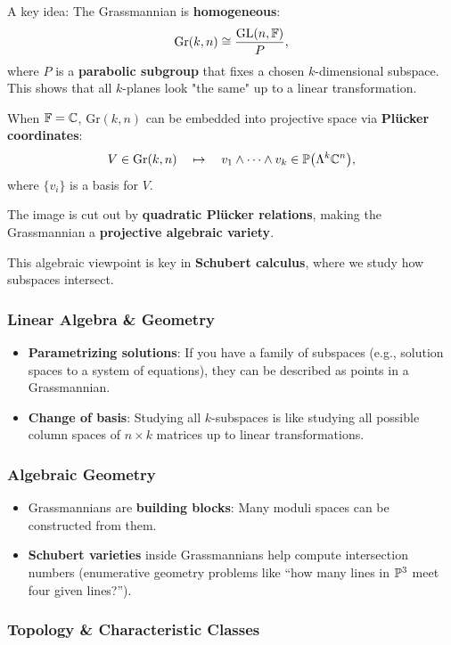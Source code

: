 \documentclass{amsart}
\let\originalmathbb\mathbb
\renewcommand{\mathbb}[1]{%
    \ifstrequal{#1}{1}{\mathbbm{#1}}{\originalmathbb{#1}}%
}
\theoremstyle{plain}
\theoremstyle{definition}
\theoremstyle{remark}
\begin{document}
A key idea:
The Grassmannian is \textbf{homogeneous}:
\[
\mathrm{Gr}(k, n) \cong \frac{\mathrm{GL}(n, \mathbb{F})}{P},
\]
where $P$ is a \textbf{parabolic subgroup} that fixes a chosen $k$-dimensional subspace. This shows that all $k$-planes look "the same" up to a linear transformation.

When $\mathbb{F} = \mathbb{C}$, $\mathrm{Gr}(k, n)$ can be embedded into projective space via \textbf{Plücker coordinates}:
\[
V \in \mathrm{Gr}(k, n) \quad \mapsto \quad v_1 \wedge \cdots \wedge v_k \in \mathbb{P}\big(\Lambda^k \mathbb{C}^n\big),
\]
where $\{v_i\}$ is a basis for $V$.

The image is cut out by \textbf{quadratic Plücker relations}, making the Grassmannian a \textbf{projective algebraic variety}.

This algebraic viewpoint is key in \textbf{Schubert calculus}, where we study how subspaces intersect.

\subsubsection{\textbf{Linear Algebra \& Geometry}}

\begin{itemize}
	\item \textbf{Parametrizing solutions}: If you have a family of subspaces (e.g., solution spaces to a system of equations), they can be described as points in a Grassmannian.
	\item \textbf{Change of basis}: Studying all $k$-subspaces is like studying all possible column spaces of $n \times k$ matrices up to linear transformations.
\end{itemize}

\subsubsection{\textbf{Algebraic Geometry}}

\begin{itemize}
	\item Grassmannians are \textbf{building blocks}: Many moduli spaces can be constructed from them.
	\item \textbf{Schubert varieties} inside Grassmannians help compute intersection numbers (enumerative geometry problems like “how many lines in $\mathbb{P}^3$ meet four given lines?”).
\end{itemize}

\subsubsection{\textbf{Topology \& Characteristic Classes}}
\end{document}
